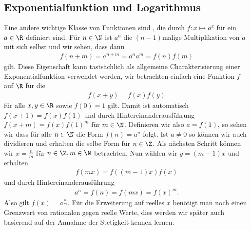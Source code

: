 \documentclass[letterpaper,10pt,english]{jupyterBook}
\begin{document}
\subsection{Exponentialfunktion und Logarithmus}
\label{\detokenize{vorkurs/funktionen:exponentialfunktion-und-logarithmus}}
Eine andere wichtige Klasse von Funktionen sind , die durch \(f: x\mapsto a^x\) für ein \(a \in \R\) definiert sind. Für \(n \in \N\) ist \(a^n\) die \((n-1)\)\sphinxhyphen{}malige Multiplikation von \(a\) mit sich selbst und wir sehen, dass dann
\begin{equation*}
\begin{split} f(n+m) = a^{n+m}  = a^n a^m  = f(n) f(m) \end{split}
\end{equation*}
gilt. Diese Eigenschaft kann tastsächlich als allgemeine Charakterisierung einer Exponentialfunktion verwendet werden, wir betrachten einfach eine Funktion \(f\) auf \(\R\) für die
\begin{equation*}
\begin{split} f(x+y) =  f(x) f(y) \end{split}
\end{equation*}
für alle \(x,y \in \R\) sowie \(f(0)=1\)
gilt. Damit ist automatisch \(f(x+1) = f(x) f(1)\) und durch Hintereinanderausführung \(f(x+m) = f(x) f(1)^m\) für \(m \in \N\). Definieren wir also \(a=f(1)\), so sehen wir dass für alle \(n \in \N\) die Form \(f(n) = a^n\) folgt. Ist \(a \neq 0\) so können wir auch dividieren und erhalten die selbe Form für \(n \in \Z\). Als nächsten Schritt können wir \(x= \frac{n}m\) für \(n \in \Z, m \in \N\) betrachten. Nun wählen wir \(y=(m-1) x\) und erhalten
\begin{equation*}
\begin{split} f(m x) = f((m-1)x) f(x) \end{split}
\end{equation*}
und durch Hintereinanderausführung
\begin{equation*}
\begin{split} a^n = f(n) = f(mx) = f(x)^m. \end{split}
\end{equation*}
Also gilt \(f(x) = a^{\frac{n}m}. \) Für die Erweiterung auf reelles \(x\) benötigt man noch einen Grenzwert von rationalen gegen reelle Werte, dies werden wir später auch basierend auf der Annahme der Stetigkeit kennen lernen.
\end{document}

